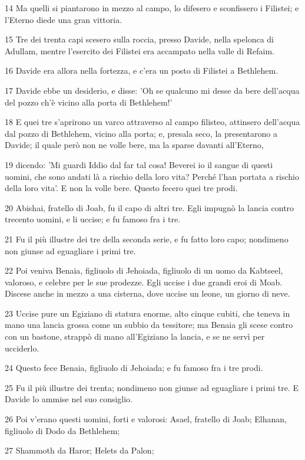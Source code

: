 \par 14 Ma quelli si piantarono in mezzo al campo, lo difesero e sconfissero i Filistei; e l'Eterno diede una gran vittoria.
\par 15 Tre dei trenta capi scesero sulla roccia, presso Davide, nella spelonca di Adullam, mentre l'esercito dei Filistei era accampato nella valle di Refaim.
\par 16 Davide era allora nella fortezza, e c'era un posto di Filistei a Bethlehem.
\par 17 Davide ebbe un desiderio, e disse: 'Oh se qualcuno mi desse da bere dell'acqua del pozzo ch'è vicino alla porta di Bethlehem!'
\par 18 E quei tre s'aprirono un varco attraverso al campo filisteo, attinsero dell'acqua dal pozzo di Bethlehem, vicino alla porta; e, presala seco, la presentarono a Davide; il quale però non ne volle bere, ma la sparse davanti all'Eterno,
\par 19 dicendo: 'Mi guardi Iddio dal far tal cosa! Beverei io il sangue di questi uomini, che sono andati là a rischio della loro vita? Perché l'han portata a rischio della loro vita'. E non la volle bere. Questo fecero quei tre prodi.
\par 20 Abishai, fratello di Joab, fu il capo di altri tre. Egli impugnò la lancia contro trecento uomini, e li uccise; e fu famoso fra i tre.
\par 21 Fu il più illustre dei tre della seconda serie, e fu fatto loro capo; nondimeno non giunse ad eguagliare i primi tre.
\par 22 Poi veniva Benaia, figliuolo di Jehoiada, figliuolo di un uomo da Kabtseel, valoroso, e celebre per le sue prodezze. Egli uccise i due grandi eroi di Moab. Discese anche in mezzo a una cisterna, dove uccise un leone, un giorno di neve.
\par 23 Uccise pure un Egiziano di statura enorme, alto cinque cubiti, che teneva in mano una lancia grossa come un subbio da tessitore; ma Benaia gli scese contro con un bastone, strappò di mano all'Egiziano la lancia, e se ne servì per ucciderlo.
\par 24 Questo fece Benaia, figliuolo di Jehoiada; e fu famoso fra i tre prodi.
\par 25 Fu il più illustre dei trenta; nondimeno non giunse ad eguagliare i primi tre. E Davide lo ammise nel suo consiglio.
\par 26 Poi v'erano questi uomini, forti e valorosi: Asael, fratello di Joab; Elhanan, figliuolo di Dodo da Bethlehem;
\par 27 Shammoth da Haror; Helets da Palon;
